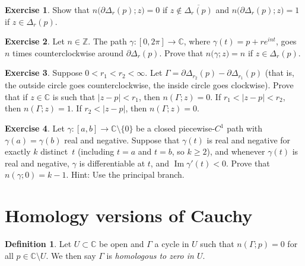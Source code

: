 \documentclass[12pt,openany]{book}
\renewcommand{\Im}{\operatorname{Im}}
\newcommand{\sabs}[1]{\lvert {#1} \rvert}
\newcommand{\C}{{\mathbb{C}}}
\newcommand{\Z}{{\mathbb{Z}}}
\newcommand{\myindex}[1]{#1\index{#1}}
\theoremstyle{plain}
\theoremstyle{remark}
\theoremstyle{definition}
\newtheorem{defn}[thm]{Definition}
\newenvironment{exbox}{%
    \def\FrameCommand{\vrule width 1pt \relax\hspace{10pt}}%
    \MakeFramed{\advance\hsize-\width\FrameRestore}%
}{%
    \endMakeFramed
}
\theoremstyle{exercise}
\newtheorem{exercise}{Exercise}[section]
\theoremstyle{example}
\begin{document}
\begin{exbox}
\begin{exercise}%
\label{exercise:windingcircle}
Show that $n\bigl(\partial \Delta_r(p);z\bigr) = 0$ if $z \notin
\overline{\Delta_r(p)}$ and 
$n\bigl(\partial \Delta_r(p);z\bigr) = 1$ if $z \in \Delta_r(p)$.
\end{exercise}

\begin{exercise}
Let $n \in \Z$.  The path $\gamma \colon [0,2\pi] \to \C$, where
$\gamma(t) = p + re^{in t}$, goes $n$ times
counterclockwise around $\partial \Delta_r(p)$.
Prove that
$n\bigl(\gamma;z\bigr) = n$ if $z \in \Delta_r(p)$.
\end{exercise}

\begin{exercise}%
\label{exercise:windingcircles}
Suppose $0 < r_1 < r_2 < \infty$.
Let $\Gamma = \partial \Delta_{r_2}(p) - \partial \Delta_{r_1} (p)$
(that is, the outside circle goes counterclockwise, the inside circle goes
clockwise).
Prove that if $z \in \C$ is such that $\sabs{z-p} < r_1$, then
$n(\Gamma;z) = 0$.  If $r_1 < \sabs{z-p} < r_2$, then
$n(\Gamma;z) = 1$.  If $r_2 < \sabs{z-p}$, then
$n(\Gamma;z) = 0$.
\end{exercise}

\begin{exercise}%
\label{exercise:rayktimes}
Let $\gamma \colon [a,b] \to \C \setminus \{ 0 \}$ be a closed
piecewise-$C^1$ path with
$\gamma(a) = \gamma(b)$ real and negative.  Suppose
that $\gamma(t)$ is real and negative for exactly $k$ distinct~$t$
(including $t=a$ and $t=b$, so $k \geq 2$), and whenever $\gamma(t)$ is real
and negative, $\gamma$ is differentiable at $t$, and
$\Im \gamma'(t) < 0$.  Prove that $n(\gamma;0) = k-1$.  Hint: Use
the principal branch.
\end{exercise}
\end{exbox}



\section{Homology versions of Cauchy}

\begin{defn}
Let $U \subset \C$ be open and $\Gamma$
a cycle
in $U$
such that $n(\Gamma;p) = 0$ for all $p \in \C \setminus U$.
We then
say $\Gamma$ is \emph{\myindex{homologous to zero} in $U$}.
\end{defn}
\end{document}
